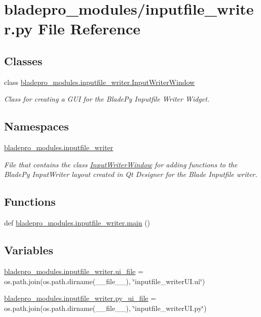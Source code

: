 \hypertarget{a00005}{}\section{bladepro\+\_\+modules/inputfile\+\_\+writer.py File Reference}
\label{a00005}
\subsection*{Classes}
\begin{DoxyCompactItemize}
\item 
class \hyperlink{a00070}{bladepro\+\_\+modules.\+inputfile\+\_\+writer.\+Input\+Writer\+Window}
\begin{DoxyCompactList}\small\item\em Class for creating a G\+UI for the Blade\+Py Inputfile Writer Widget. \end{DoxyCompactList}\end{DoxyCompactItemize}
\subsection*{Namespaces}
\begin{DoxyCompactItemize}
\item 
 \hyperlink{a00048}{bladepro\+\_\+modules.\+inputfile\+\_\+writer}
\begin{DoxyCompactList}\small\item\em File that contains the class \hyperlink{a00070}{Input\+Writer\+Window} for adding functions to the Blade\+Py Input\+Writer layout created in Qt Designer for the Blade Inputfile writer. \end{DoxyCompactList}\end{DoxyCompactItemize}
\subsection*{Functions}
\begin{DoxyCompactItemize}
\item 
def \hyperlink{a00048_af7196fb030213564f7a096e5437b03c6}{bladepro\+\_\+modules.\+inputfile\+\_\+writer.\+main} ()
\end{DoxyCompactItemize}
\subsection*{Variables}
\begin{DoxyCompactItemize}
\item 
\hyperlink{a00048_a1b76e57504b8ccc9af88c21882fd995f}{bladepro\+\_\+modules.\+inputfile\+\_\+writer.\+ui\+\_\+file} = os.\+path.\+join(os.\+path.\+dirname(\+\_\+\+\_\+file\+\_\+\+\_\+), \char`\"{}inputfile\+\_\+writer\+U\+I.\+ui\char`\"{})
\item 
\hyperlink{a00048_ad7ae10efada37c5353710ada1cb4b756}{bladepro\+\_\+modules.\+inputfile\+\_\+writer.\+py\+\_\+ui\+\_\+file} = os.\+path.\+join(os.\+path.\+dirname(\+\_\+\+\_\+file\+\_\+\+\_\+), \char`\"{}inputfile\+\_\+writer\+U\+I.\+py\char`\"{})
\end{DoxyCompactItemize}

